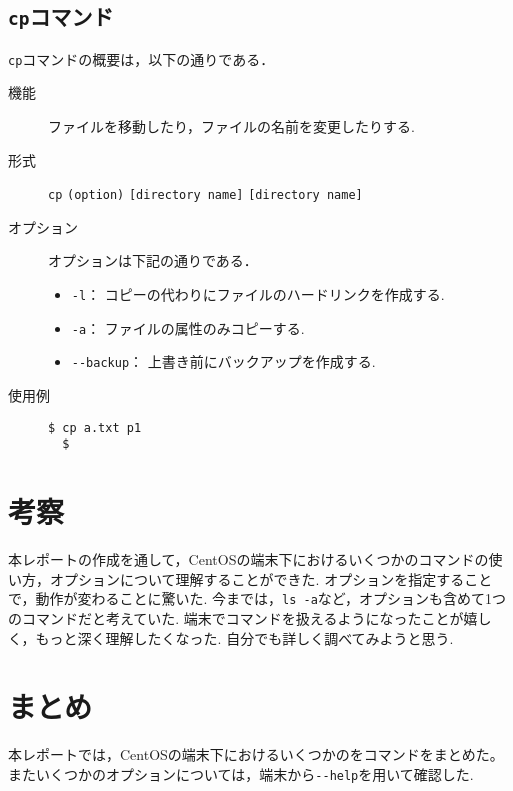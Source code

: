 \documentclass[a4j,11pt]{jarticle}
\begin{document}
\subsection{\texttt{cp}コマンド}
\verb|cp|コマンドの概要は，以下の通りである．
\begin{description}
  \item[機能] %
     ファイルを移動したり，ファイルの名前を変更したりする.
  \item[形式] %
    \verb|cp| \verb|(option)| \verb|[directory name]| \verb|[directory name]|
  \item[オプション] %
オプションは下記の通りである．
 \begin{itemize}
      \item \verb|-l|：  コピーの代わりにファイルのハードリンクを作成する.
      \item \verb|-a|：  ファイルの属性のみコピーする.
      \item \verb|--backup|：  上書き前にバックアップを作成する.
    \end{itemize}
  \item[使用例] %
    \begin{verbatim}
$ cp a.txt p1
  $
    \end{verbatim}
\end{description}



\section{考察}
本レポートの作成を通して，CentOSの端末下におけるいくつかのコマンドの使い方，オプションについて理解することができた.
オプションを指定することで，動作が変わることに驚いた.
今までは，\verb|ls -a|など，オプションも含めて1つのコマンドだと考えていた.
端末でコマンドを扱えるようになったことが嬉しく，もっと深く理解したくなった.
自分でも詳しく調べてみようと思う.

\section{まとめ}
本レポートでは，CentOSの端末下におけるいくつかのをコマンドをまとめた。またいくつかのオプションについては，端末から\verb|--help|を用いて確認した.
\end{document}
